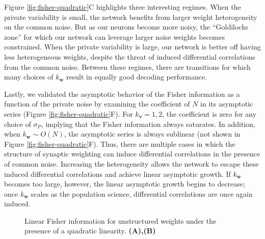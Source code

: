 \documentclass[11pt]{article}
\begin{document}
	Figure \ref{fig:fisher-quadratic}C highlights three interesting regimes. When the private variability is small, the network benefits from larger weight heterogeneity on the common noise. But as our neurons become more noisy, the ``Goldilocks zone'' for which our network can leverage larger noise weights becomes constrained. When the private variability is large, our network is better off having less heterogeneous weights, despite the threat of induced differential correlations from the common noise. Between these regimes, there are transitions for which many choices of $k_{\mathbf{w}}$ result in equally good decoding performance.
	
	Lastly, we validated the asymptotic behavior of the Fisher information as a function of the private noise by examining the coefficient of $N$ in its asymptotic series (Figure \ref{fig:fisher-quadratic}F). For $k_{\mathbf{v}}=1,2$, the coefficient is zero for any choice of $\sigma_P$, implying that the Fisher information always saturates. In addition, when $k_{\mathbf{w}}\sim O(N)$, the asymptotic series is always sublinear (not shown in Figure \ref{fig:fisher-quadratic}F). Thus, there are multiple cases in which the structure of synaptic weighting can induce differential correlations in the presence of common noise. Increasing the heterogeneity allows the network to escape these induced differential correlations and achieve linear asymptotic growth. If $k_{\mathbf{w}}$ becomes too large, however, the linear asymptotic growth begins to decrease; once $k_{\mathbf{w}}$ scales as the population science, differential correlations are once again induced.
	
	\begin{figure}[t]
		\centering
		\caption{Linear Fisher information for unstructured weights under the presence of a quadratic linearity. \textbf{(A),(B)} } 
		\label{fig:unstructured-quadratic-fisher}
	\end{figure}
	
\end{document}
